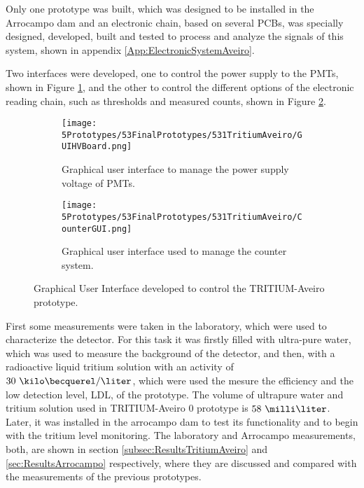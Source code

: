 Only one prototype was built, which was designed to be installed in the Arrocampo dam and an electronic chain, based on several PCBs, was specially designed, developed, built and tested to process and analyze the signals of this system, shown in appendix \ref{App:ElectronicSystemAveiro}.

Two interfaces were developed, one to control the power supply to the PMTs, shown in Figure \ref{subfig:GUIHV}, and the other to control the different options of the electronic reading chain, such as thresholds and measured counts, shown in Figure \ref{subfig:GUIcounts}.

\begin{figure}
\centering
    \begin{subfigure}[b]{0.65\textwidth}
    \centering
    \texttt{[image: 5Prototypes/53FinalPrototypes/531TritiumAveiro/GUIHVBoard.png]}  
    \caption{Graphical user interface to manage the power supply voltage of PMTs.\label{subfig:GUIHV}}
    \end{subfigure}
    \hfill
    \begin{subfigure}[b]{0.8\textwidth}
    \centering
    \texttt{[image: 5Prototypes/53FinalPrototypes/531TritiumAveiro/CounterGUI.png]}  
    \caption{Graphical user interface used to manage the counter system.\label{subfig:GUIcounts}}
    \end{subfigure}
 \caption{Graphical User Interface developed to control the TRITIUM-Aveiro prototype.}
 \label{fig:GUITRITIUMAveiro}
\end{figure}

First some measurements were taken in the laboratory, which were used to characterize the detector. For this task it was firstly filled with ultra-pure water, which was used to measure the background of the detector, and then, with a radioactive liquid tritium solution with an activity of $30~\kilo\becquerel/\liter$, which were used the mesure the efficiency and the low detection level, LDL, of the prototype. The volume of ultrapure water and tritium solution used in TRITIUM-Aveiro 0 prototype is $58~\milli\liter$. Later, it was installed in the arrocampo dam to test its functionality and to begin with the tritium level monitoring. The laboratory and Arrocampo measurements, both, are shown in section \ref{subsec:ResultsTritiumAveiro} and \ref{sec:ResultsArrocampo} respectively, where they are discussed and compared with the measurements of the previous prototypes.